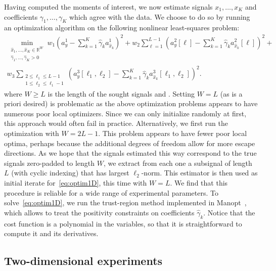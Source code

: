 \documentclass[english,11pt]{article}
\newcommand{\TODO}[1]{{\color{red}{[#1]}}}
\numberwithin{equation}{section}
\theoremstyle{plain}
\theoremstyle{definition}
\theoremstyle{remark}
\theoremstyle{plain}
\theoremstyle{remark}
\theoremstyle{plain}
\theoremstyle{plain}
\newcommand{\reals}{\mathbb{R}}
\begin{document}
Having computed the moments of interest, we now estimate signals $x_1, \ldots, x_K$ and coefficients $\gamma_1, \ldots, \gamma_K$ which agree with the data. We choose to do so by running an optimization algorithm on the following nonlinear least-squares problem:
\begin{multline}
	\min_{\substack{\hat x_1, \ldots, \hat x_K \in \reals^{W} \\ \hat \gamma_1, \ldots, \hat \gamma_K > 0}} w_1 \left( a_y^1 - \sum_{k=1}^K \hat \gamma_k a_{\hat x_k}^1 \right)^2 + w_2 \sum_{\ell = 1}^{L-1} \left( a_y^2[\ell] - \sum_{k=1}^K \hat \gamma_k a_{\hat x_k}^2[\ell] \right)^2 + \\ w_3 \sum_{\substack{2\leq\ell_1\leq L-1 \\ 1 \leq \ell_2 \leq \ell_1-1}} \left( a_y^3[\ell_1, \ell_2] - \sum_{k=1}^K \hat \gamma_k a_{\hat x_k}^3[\ell_1,\ell_2] \right)^2.
	\label{eq:optim1D}
\end{multline}
where $W \geq L$ is the length of the sought signals and \TODO{explain $w_i$'s: currently they are $w_1 = 1/2, w_2 = 1/2n_2, w_3 = 1/2n_3$, where $n_2, n_3$ are the number of moments used: $n_2 = L-1$, $n_3 = \frac{(L-1)(L-2)}{2}$. Issue is: this is not very smart..}. Setting $W = L$ (as is a priori desired) is problematic as the above optimization problems appears to have numerous poor local optimizers. Since we can only initialize randomly at first, this approach would often fail in practice. Alternatively, we first run the optimization with $W = 2L-1$. This problem appears to have fewer poor local optima, perhaps because the additional degrees of freedom allow for more escape directions. As we hope that the signals estimated this way correspond to the true signals zero-padded to length $W$, we extract from each one a subsignal of length $L$ (with cyclic indexing) that has largest $\ell_2$-norm. This estimator is then used as initial iterate for~\eqref{eq:optim1D}, this time with $W = L$. We find that this procedure is reliable for a wide range of experimental parameters. To solve~\eqref{eq:optim1D}, we run the trust-region method implemented in Manopt~\cite{manopt}, which allows to treat the positivity constraints on coefficients $\hat \gamma_k$. Notice that the cost function is a polynomial in the variables, so that it is straightforward to compute it and its derivatives.


\subsection{Two-dimensional experiments} 
\end{document}
